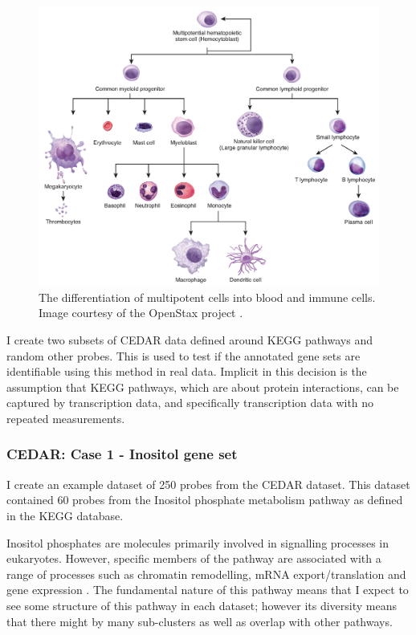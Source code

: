 \documentclass[14pt]{extarticle} %
\begin{document}
	\begin{figure}[h]
		\centering
		\includegraphics[scale=0.75]{Images/white_blood_cell_differentiation.jpg}
		\caption{The differentiation of multipotent cells into blood and immune cells. Image courtesy of the OpenStax project \citep{OpenStaxAnatomyPhysiology2016}.}
		\label{fig:white_blood_cell_differentiation}
	\end{figure}

	 I create two subsets of CEDAR data defined around KEGG pathways and random other probes. This is used to test if the annotated gene sets are identifiable using this method in real data. Implicit in this decision is the assumption that KEGG pathways, which are about protein interactions, can be captured by transcription data, and specifically transcription data with no repeated measurements. 
	 

	 \subsubsection{CEDAR: Case 1 - Inositol gene set} \label{sec:case_studies:cedar:dataset_1}

	I create an example dataset of 250 probes from the CEDAR dataset. This dataset contained 60 probes from the Inositol phosphate metabolism pathway as defined in the KEGG database.
	
	Inositol phosphates are molecules primarily involved in signalling processes in eukaryotes. However, specific members of the pathway are associated with a range of processes such as chromatin remodelling, mRNA export/translation and gene expression \citep{monserrate2010inositol}. The fundamental nature of this pathway means that I expect to see some structure of this pathway in each dataset; however its diversity means that there might by many sub-clusters as well as overlap with other pathways.
	
\end{document}
